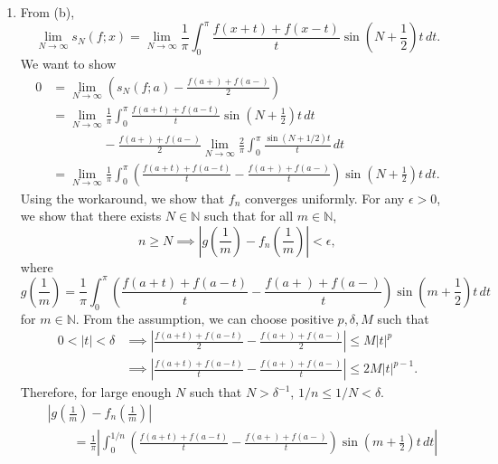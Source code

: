 \documentclass[12pt]{report}
\newcommand{\num}[1]{\item[\textbf{\sffamily #1}]}
\newcommand{\inv}{^{-1}}
\newcommand{\abs}[1]{\left| #1 \right|}
\newcommand{\paren}[1]{\left( #1 \right)}
\newcommand{\ra}{\rightarrow}
\newcommand{\N}{\mathbb{N}}
\renewcommand{\d}[1]{\,d{#1}}
\begin{document}
\begin{enumerate}
\begin{enumerate}
        \num{(c)} From {\sffamily (b)},
        \[
            \lim_{N \ra \infty} s_N(f; x) = \lim_{N\ra\infty} \frac{1}{\pi} \int_0^\pi \frac{f(x+t) + f(x-t)}{t} \sin\paren{N + \frac{1}{2}}t \d{t}.
        \]
        We want to show
        \[
            \begin{aligned}
                0 & = \lim_{N \ra \infty} \paren{s_N(f; a) - \frac{f(a+) + f(a-)}{2}}                                                                                 \\
                  & = \lim_{N \ra \infty} \frac{1}{\pi} \int_0^\pi \frac{f(a+t) + f(a-t)}{t} \sin\paren{N + \frac{1}{2}}t \d{t}                                       \\ & \qquad \qquad- \frac{f(a+) + f(a-)}{2} \lim_{N\ra\infty} \frac{2}{\pi} \int_0^\pi \frac{\sin\paren{N + 1/2}t}{t}\d{t} \\
                  & = \lim_{N \ra\infty} \frac{1}{\pi} \int_0^\pi \left(\frac{f(a+t) + f(a-t)}{t} - \frac{f(a+) + f(a-)}{t}\right)\sin\paren{N + \frac{1}{2}}t \d{t}.
            \end{aligned}
        \]
        Using the workaround, we show that \(f_n\) converges uniformly. For any \(\epsilon > 0\), we show that there exists \(N \in \N\) such that for all \(m \in \N\),
        \[
            n \geq N \implies \abs{g\paren{\frac{1}{m}} - f_n \paren{\frac{1}{m}}} < \epsilon,
        \]
        where
        \[
            g\paren{\frac{1}{m}} = \frac{1}{\pi} \int_0^\pi \left(\frac{f(a+t) + f(a-t)}{t} - \frac{f(a+) + f(a-)}{t}\right)\sin\paren{m + \frac{1}{2}}t \d{t}
        \]
        for \(m \in \N\). From the assumption, we can choose positive \(p, \delta, M\) such that
        \[
            \begin{aligned}
                0 < \abs{t} < \delta & \implies \abs{\frac{f(a + t) + f(a - t)}{2} - \frac{f(a+) + f(a-)}{2}} \leq M\abs{t}^p       \\
                                     & \implies \abs{\frac{f(a + t) + f(a - t)}{t} - \frac{f(a+) + f(a-)}{t}} \leq 2M\abs{t}^{p-1}.
            \end{aligned}
        \]
        Therefore, for large enough \(N\) such that \(N > \delta\inv\), \(1/n \leq 1/N < \delta\).
        \[
            \begin{aligned}
                 & \abs{g\paren{\frac{1}{m}} - f_n \paren{\frac{1}{m}}}                                                                                         \\
                 & \qquad = \frac{1}{\pi} \abs{\int_0^{1/n} \left(\frac{f(a+t) + f(a-t)}{t} - \frac{f(a+) + f(a-)}{t}\right)\sin\paren{m + \frac{1}{2}}t \d{t}} \\

\end{aligned}\]
\end{enumerate}
\end{enumerate}
\end{document}
